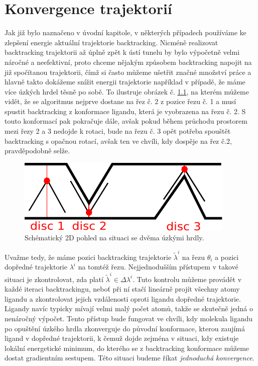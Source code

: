 \chapter{Konvergence trajektorií}
Jak již bylo naznačeno v úvodní kapitole, v některých případech používáme ke
zlepšení energie aktuální trajektorie backtracking. Nicméně realizovat
backtracking trajektorii až úplně zpět k ústí tunelu by bylo výpočetně velmi náročné
a neefektivní, proto chceme nějakým způsobem backtracking napojit na již
spočítanou trajektorii, čímž si často můžeme ušetřit značné množství práce a hlavně
takto dokážeme snížit energii trajektorie například v případě, že máme více úzkých
hrdel těsně po sobě. To ilustruje obrázek č. \ref{fig:two_bottlenecks}, na kterém
můžeme vidět, že se algoritmus nejprve dostane na řez č. 2 z pozice řezu č. 1
a musí spustit backtracking z konformace ligandu, která je vyobrazena na řezu č. 2.
S touto konformací pak pokračuje dále, avšak pokud během průchodu prostorem
mezi řezy 2 a 3 nedojde k rotaci, bude na řezu č. 3 opět potřeba spouštět
backtracking s opačnou rotací, avšak ten ve chvíli, kdy dospěje na řez č.2,
pravděpodobně selže.

\begin{figure}[ht]
\centering
\includegraphics[width=.5\hsize]{img/two_bottlenecks.pdf}
\caption{Schématický 2D pohled na situaci se dvěma úzkými hrdly.}
\label{fig:two_bottlenecks}
\end{figure}

Uvažme tedy, že máme pozici backtracking trajektorie $ \tilde{\lambda}^i $
na řezu $ \theta_i $ a pozici dopředné trajektorie $ \lambda^i $ na tomtéž řezu.
Nejjednodušším přístupem v takové situaci je zkontrolovat, zda platí
$ \tilde{\lambda}^i \in \Delta \lambda^i $. Tuto kontrolu můžeme provádět v každé
iteraci backtrackingu, neboť při ní stačí lineárně projít všechny atomy ligandu
a zkontrolovat jejich vzdálenosti oproti ligandu dopředné trajektorie. Ligandy
navíc typicky mívají velmi malý počet atomů, takže se skutečně jedná o nenáročný
výpočet. Tento přístup bude fungovat ve chvíli, kdy molekula ligandu po opuštění
úzkého hrdla zkonverguje do původní konformace, kterou zaujímá ligand v dopředné
trajektorii, k čemuž dojde zejména v situaci, kdy existuje lokální energetické
minimum, do kterého se z backtracking konformace můžeme dostat gradientním sestupem.
Této situaci budeme říkat \textit{jednoduchá konvergence}.

